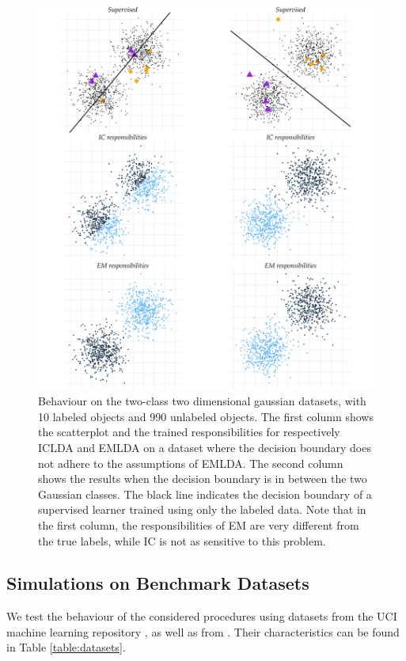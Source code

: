\documentclass[twoside]{memoir}\usepackage[]{graphicx}\usepackage{xcolor}
\makeatletter
\def\maxwidth{ %
  \ifdim\Gin@nat@width>\linewidth
    \linewidth
  \else
    \Gin@nat@width
  \fi
}
\newenvironment{knitrout}{}{} %
\renewcommand{\cite}{\citep}
\makeatother
\begin{document}
\begin{knitrout}
\color{fgcolor}\begin{figure}
\includegraphics[width=\maxwidth]{figure/toyplots-1} \caption[Behaviour on the two-class two dimensional gaussian datasets, with 10 labeled objects and 990 unlabeled objects]{Behaviour on the two-class two dimensional gaussian datasets, with 10 labeled objects and 990 unlabeled objects. The first column shows the scatterplot and the trained responsibilities for respectively ICLDA and EMLDA on a dataset where the decision boundary does not adhere to the assumptions of EMLDA. The second column shows the results when the decision boundary is in between the two Gaussian classes. The black line indicates the decision boundary of a supervised learner trained using only the labeled data. Note that in the first column, the responsibilities of EM are very different from the true labels, while IC is not as sensitive to this problem.}\label{fig:toyplots}
\end{figure}


\end{knitrout}


\subsection{Simulations on Benchmark Datasets}
We test the behaviour of the considered procedures using datasets from the UCI machine learning repository \cite{Lichman2013}, as well as from \cite{Chapelle2006}. Their characteristics can be found in Table \ref{table:datasets}.
\end{document}
